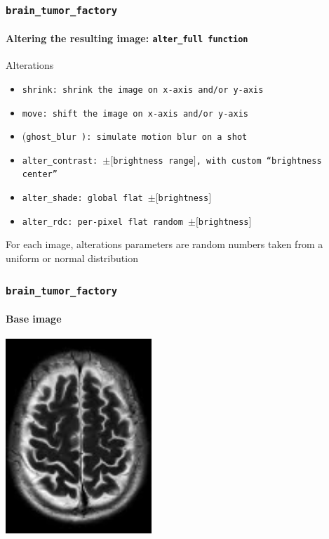 \documentclass[]{beamer}
\newcommand{\btf}{\tt{brain\_tumor\_factory}}
\newcommand{\ca}[1]{\tt{\alert{#1}}}
\newcommand{\icdc}[1]{\alert{$\pm{}[$}#1\alert{$]$}}
\begin{document}
\begin{frame}
  \frametitle{\btf}
  \framesubtitle{Altering the resulting image: \tt{alter\_full} function}
  \begin{block}{Alterations}
    \begin{itemize}
      \item \ca{shrink}: shrink the image on x-axis and/or y-axis
      \item \ca{move}: shift the image on x-axis and/or y-axis
      \item (\ca{ghost\_blur~}): simulate motion blur on a shot
      \item \ca{alter\_contrast}: \icdc{brightness range}, with custom ``brightness center''
      \item \ca{alter\_shade}: global flat \icdc{brightness}
      \item \ca{alter\_rdc}: per-pixel flat random \icdc{brightness}
    \end{itemize}
  \end{block}

  For each image, alterations parameters are random numbers taken from a \alert{uniform} or \alert{normal} distribution
\end{frame}

\begin{frame}
  \frametitle{\btf}
  \framesubtitle{Base image}
  \begin{center}
    \includegraphics[width=5.5cm]{resources/brain_base}
  \end{center}
\end{frame}
\end{document}
